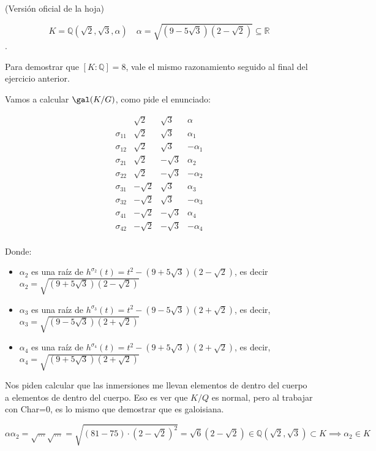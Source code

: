 \begin{problem}[5] (Versión oficial de la hoja)

$$K = ℚ(\sqrt{2},\sqrt{3},α) \quad α = \sqrt{(9-5\sqrt{3})(2-\sqrt{2})} \subseteq ℝ$$.

\solution

Para demostrar que $[K:ℚ] = 8$, vale el mismo razonamiento seguido al final del ejercicio anterior.


Vamos a calcular $\gal(K/G)$, como pide el enunciado:

$$\begin{array}{c|c|c|c}
&\sqrt{2}&\sqrt{3} & α \\\hline
σ_{11} & \sqrt{2} & \sqrt{3} & α_1 \\
σ_{12} & \sqrt{2} & \sqrt{3} & -α_1 \\\hline

σ_{21} & \sqrt{2} & -\sqrt{3} &  α_2\\
σ_{22} & \sqrt{2} & -\sqrt{3} & -α_2 \\\hline

σ_{31} & -\sqrt{2} & \sqrt{3} & α_3 \\
σ_{32} & -\sqrt{2} & \sqrt{3} & -α_3 \\\hline

σ_{41} & -\sqrt{2} & -\sqrt{3} & α_4 \\
σ_{42} & -\sqrt{2} & -\sqrt{3} & -α_4 \\
\end{array}
$$



Donde: 
\begin{itemize}
\item $α_2$ es una raíz de  $h^{σ_2}(t) = t^2 - (9+5\sqrt{3})(2-\sqrt{2})$, es decir $α_2 = \sqrt{(9+5\sqrt{3})(2-\sqrt{2})}$

\item $α_3$ es una raíz de $h^{σ_3}(t) = t^2 - (9-5\sqrt{3})(2+\sqrt{2})$, es decir, $α_3 = \sqrt{(9-5\sqrt{3})(2+\sqrt{2})}$

\item $α_4$ es una raíz de $h^{σ_4}(t) = t^2 - (9+5\sqrt{3})(2+\sqrt{2})$, es decir, $α_4 = \sqrt{(9+5\sqrt{3})(2+\sqrt{2})}$
\end{itemize}


Nos piden calcular que las inmersiones me llevan elementos de dentro del cuerpo a elementos de dentro del cuerpo. Eso es ver que $K/Q$ es normal, pero al trabajar con Char=0, es lo mismo que demostrar que es galoisiana.


$$αα_2 = \sqrt{...}\sqrt{...} = \sqrt{(81 - 75)·(2-\sqrt{2})^2} = \sqrt{6}(2-\sqrt{2}) ∈ ℚ(\sqrt{2},\sqrt{3}) \subset K \implies α_2 ∈ K$$


\end{problem}
